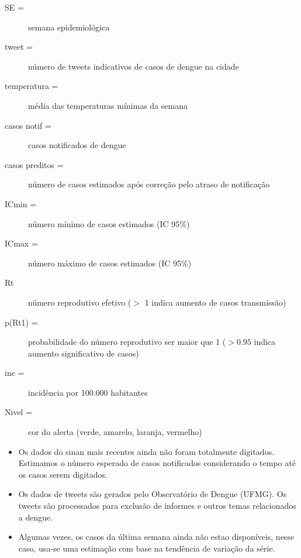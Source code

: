 \documentclass[10pt]{article} %
\begin{document}
      
     \begin{center}
            
     \end{center}


      \BackToContents %


\newpage


\begin{minipage}[t]{1\linewidth} 

\hypertarget{vartab}{}

\begin{description}
\item [SE =] semana epidemiológica
\item [tweet =] número de tweets indicativos de casos de dengue na cidade
\item [temperatura =] média das temperaturas mínimas da semana
\item [casos notif =] casos notificados de dengue 
\item [casos preditos =] número de casos estimados após correção pelo atraso de notificação
\item [ICmin =] número mínimo de casos estimados (IC 95\%)
\item [ICmax =] número máximo de casos estimados (IC 95\%)
\item [Rt] número reprodutivo efetivo ($>$ 1 indica aumento de casos transmissão)
\item [p(Rt1) =] probabilidade do número reprodutivo ser maior que 1 ($>0.95$ indica aumento significativo de casos)
\item [inc =] incidência por 100.000 habitantes
\item [Nivel =] cor do alerta (verde, amarelo, laranja, vermelho)
\end{description}

\hypertarget{notas}{}

\begin{itemize}
\item Os dados do sinan mais recentes ainda não foram totalmente digitados. Estimamos o número esperado de casos notificados considerando o tempo até os casos serem digitados.
\item Os dados de tweets são gerados pelo Observatório de Dengue (UFMG). Os tweets são processados para exclusão de informes e outros temas relacionados a dengue.
\item Algumas vezes, os casos da última semana ainda não estao disponíveis, nesse caso, usa-se uma estimação com base na tendência de variação da série.
\end{itemize}


\end{minipage}
\end{document}
